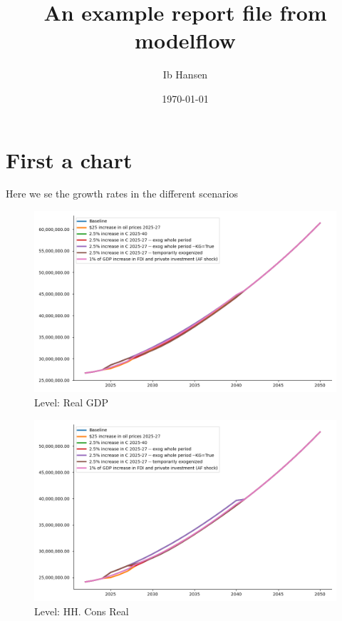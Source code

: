 \documentclass{article}
\begin{document}
\title{An example report file from modelflow }
\author{Ib Hansen}
\date{\today} 

\maketitle
\tableofcontents
\newpage
\section{First a chart} 
Here we se the growth rates in the different scenarios

 
\begin{figure}[htbp]
\centering
\includegraphics[width=\textwidth]{"../level/Real GDP, level nodif.png"}
\caption{Level: Real GDP}
\end{figure} 
 
\begin{figure}[htbp]
\centering
\includegraphics[width=\textwidth]{"../level/HH. Cons Real, level nodif.png"}
\caption{Level: HH. Cons Real}
\end{figure} 
\end{document}
